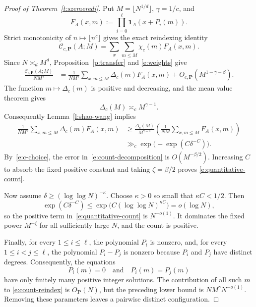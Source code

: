 \documentclass{amsart}
\newcommand{\1}{\mathbf 1}
\begin{document}
\begin{proof}[Proof of Theorem~\ref{t:szemeredi}]
Put $M=\lfloor N^{1/d}\rfloor$, $\gamma=1/c$, and
\[
 F_A(x,m):=\prod_{i=0}^{\ell}\1_A(x+P_i(m)).
\]
Strict monotonicity of $n\mapsto\lfloor n^c\rfloor$ gives the exact
reindexing identity
\begin{equation}\label{e:count-reindex}
 \mathcal C_{c,\mathbf P}(A;M)
 =\sum_x\sum_{m\leq M}\chi_c(m)F_A(x,m).
\end{equation}
Since $N\asymp_d M^d$, Proposition~\ref{p:transfer} and
\eqref{e:weights} give
\begin{align}\label{e:count-decomposition}
 \frac{\mathcal C_{c,\mathbf P}(A;M)}{NM^\gamma}
 &=\frac1{NM^\gamma}\sum_{x,m\leq M}\Delta_c(m)F_A(x,m)
 +O_{c,\mathbf P}(M^{1-\gamma-\beta}).
\end{align}
The function $m\mapsto\Delta_c(m)$ is positive and decreasing, and the
mean value theorem gives
\begin{equation}\label{e:delta-lower}
 \Delta_c(M)\asymp_c M^{\gamma-1}.
\end{equation}
Consequently Lemma~\ref{l:shao-wang} implies
\begin{align*}
 \frac1{NM^\gamma}\sum_{x,m\leq M}\Delta_c(m)F_A(x,m)
 &\geq\frac{\Delta_c(M)}{M^{\gamma-1}}
 \left(\frac1{NM}\sum_{x,m\leq M}F_A(x,m)\right)\\
 &\gg_c\exp\!\bigl(-\exp(C\delta^{-C})\bigr).
\end{align*}
By~\eqref{e:c-choice}, the error in~\eqref{e:count-decomposition} is
$O(M^{-\beta/2})$.  Increasing $C$ to absorb the fixed positive
constant and taking $\zeta=\beta/2$ proves
\eqref{e:quantitative-count}.

Now assume $\delta\geq(\log\log N)^{-\kappa}$.  Choose $\kappa>0$ so
small that $\kappa C<1/2$.  Then
\[
 \exp(C\delta^{-C})
 \leq\exp\!\bigl(C(\log\log N)^{\kappa C}\bigr)=o(\log N),
\]
so the positive term in~\eqref{e:quantitative-count} is $N^{-o(1)}$.
It dominates the fixed power $M^{-\zeta}$ for all sufficiently large
$N$, and the count is positive.


Finally, for every \(1\leq i\leq\ell\), the polynomial \(P_i\) is nonzero,
and, for every \(1\leq i<j\leq\ell\), the polynomial \(P_i-P_j\)
is nonzero because \(P_i\) and \(P_j\) have distinct degrees.
Consequently, the equations
\[
 P_i(m)=0
 \quad\text{and}\quad
 P_i(m)=P_j(m)
\]
have only finitely many positive integer solutions.
 The contribution of all such $m$ to
\eqref{e:count-reindex} is $O_{\mathbf P}(N)$, but the preceding
lower bound is $NM^\gamma N^{-o(1)}$.  Removing these parameters leaves
a pairwise distinct configuration.
\end{proof}
\end{document}
